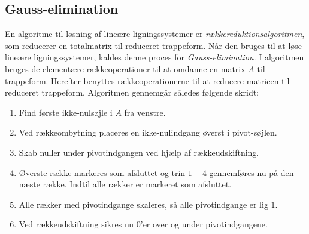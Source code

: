 \subsection{Gauss-elimination}
\label{gauss}
En algoritme til løsning af lineære ligningssystemer er  \textit{rækkereduktionsalgoritmen}, som reducerer en totalmatrix til reduceret trappeform.
Når den bruges til at løse lineære ligningssystemer, kaldes denne proces for \textit{Gauss-elimination}.
I algoritmen bruges de elementære rækkeoperationer til at omdanne en matrix $A$ til trappeform. 
Herefter benyttes rækkeoperationerne til at reducere matricen til reduceret trappeform.
Algoritmen gennemgår således følgende skridt:
%
\begin{enumerate}
\item Find første ikke-nulsøjle i $A$ fra venstre.
\item Ved rækkeombytning placeres en ikke-nulindgang øverst i pivot-søjlen.
\item Skab nuller under pivotindgangen ved hjælp af rækkeudskiftning.
\item Øverste række markeres som afsluttet og trin $1-4$ gennemføres nu på den næste række. Indtil alle rækker er markeret som afsluttet.
\item Alle rækker med pivotindgange skaleres, så alle pivotindgange er lig $1$.
\item Ved rækkeudskiftning sikres nu $0$'er over og under pivotindgangene.
\end{enumerate}
%
